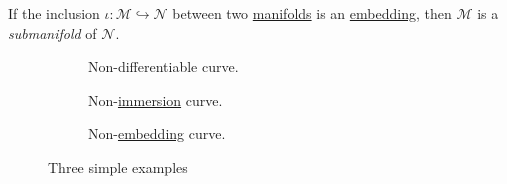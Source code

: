 \begin{definition}[Submanifold]\label{def:submanifold}
	If the inclusion \(\iota \colon \mathcal{M} \hookrightarrow \mathcal{N} \) between two \hyperref[def:smooth-manifold]{manifolds} is an \hyperref[def:embedding]{embedding}, then \(\mathcal{M} \) is a \emph{submanifold} of \(\mathcal{N} \).
\end{definition}

\begin{figure}[H]
	\centering
	\begin{subfigure}[b]{0.3\textwidth}
		\centering
		\caption{Non-differentiable curve.}
	\end{subfigure}
	\hfill
	\begin{subfigure}[b]{0.3\textwidth}
		\centering
		\caption{Non-\hyperref[def:immersion]{immersion} curve.}
	\end{subfigure}
	\hfill
	\begin{subfigure}[b]{0.3\textwidth}
		\centering
		\caption{Non-\hyperref[def:embedding]{embedding} curve.}
	\end{subfigure}
	\caption{Three simple examples}
\end{figure}

